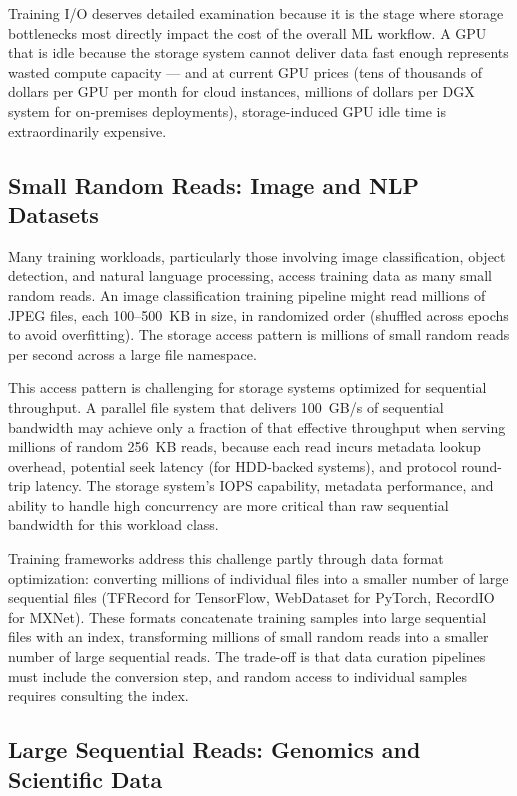 Training I/O deserves detailed examination because it is the stage where
storage bottlenecks most directly impact the cost of the overall ML workflow.
A GPU that is idle because the storage system cannot deliver data fast enough
represents wasted compute capacity --- and at current GPU prices (tens of
thousands of dollars per GPU per month for cloud instances, millions of
dollars per DGX system for on-premises deployments), storage-induced GPU idle
time is extraordinarily expensive.

\subsection{Small Random Reads: Image and NLP Datasets}

Many training workloads, particularly those involving image classification,
object detection, and natural language processing, access training data as
many small random reads. An image classification training pipeline might read
millions of JPEG files, each 100--500~KB in size, in randomized order
(shuffled across epochs to avoid overfitting). The storage access pattern is
millions of small random reads per second across a large file namespace.

This access pattern is challenging for storage systems optimized for
sequential throughput. A parallel file system that delivers 100~GB/s of
sequential bandwidth may achieve only a fraction of that effective throughput
when serving millions of random 256~KB reads, because each read incurs
metadata lookup overhead, potential seek latency (for HDD-backed systems), and
protocol round-trip latency. The storage system's IOPS capability, metadata
performance, and ability to handle high concurrency are more critical than raw
sequential bandwidth for this workload class.

Training frameworks address this challenge partly through data format
optimization: converting millions of individual files into a smaller number of
large sequential files (TFRecord for TensorFlow, WebDataset for PyTorch,
RecordIO for MXNet). These formats concatenate training samples into large
sequential files with an index, transforming millions of small random reads
into a smaller number of large sequential reads. The trade-off is that data
curation pipelines must include the conversion step, and random access to
individual samples requires consulting the index.

\subsection{Large Sequential Reads: Genomics and Scientific Data}

